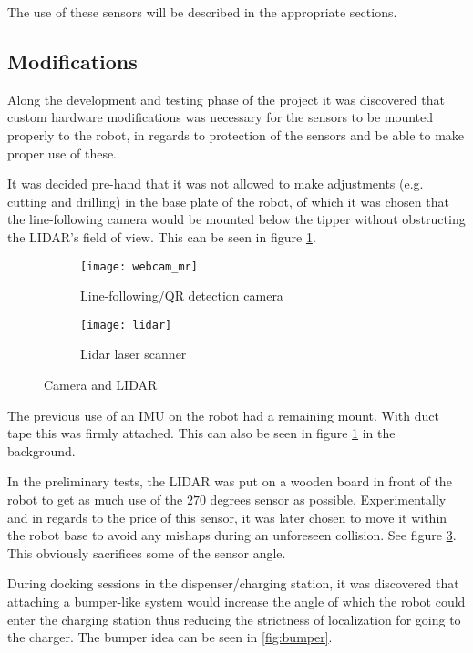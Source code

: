 The use of these sensors will be described in the appropriate sections.\\

\subsection{Modifications}
Along the development and testing phase of the project it was discovered that custom hardware modifications was necessary for the sensors to be mounted properly to the robot, in regards to protection of the sensors and be able to make proper use of these.

It was decided pre-hand that it was not allowed to make adjustments (e.g. cutting and drilling) in the base plate of the robot, of which it was chosen that the line-following camera would be mounted below the tipper without obstructing the LIDAR's field of view. This can be seen in figure \ref{fig:webcam_mr}.

  	\begin{figure}[H]
        \centering
        \begin{subfigure}{0.48\textwidth}
			\texttt{[image: webcam\_mr]}
			\caption{Line-following/QR detection camera}
			\label{fig:webcam_mr}
        \end{subfigure}
        \hspace{10pt}
        \begin{subfigure}{0.48\textwidth}
			\texttt{[image: lidar]}
			\caption{Lidar laser scanner}
			\label{fig:lidar}
    \end{subfigure}
    \caption{Camera and LIDAR}
    \end{figure}
	
The previous use of an IMU on the robot had a remaining mount. With duct tape this was firmly attached. This can also be seen in figure \ref{fig:webcam_mr} in the background.

In the preliminary tests, the LIDAR was put on a wooden board in front of the robot to get as much use of the $270$ degrees sensor as possible. 
Experimentally and in regards to the price of this sensor, it was later chosen to move it within the robot base to avoid any mishaps during an unforeseen collision. See figure \ref{fig:lidar}. This obviously sacrifices some of the sensor angle.

During docking sessions in the dispenser/charging station, it was discovered that attaching a bumper-like system would increase the angle of which the robot could enter the charging station thus reducing the strictness of localization for going to the charger. The bumper idea can be seen in \ref{fig:bumper}.  

